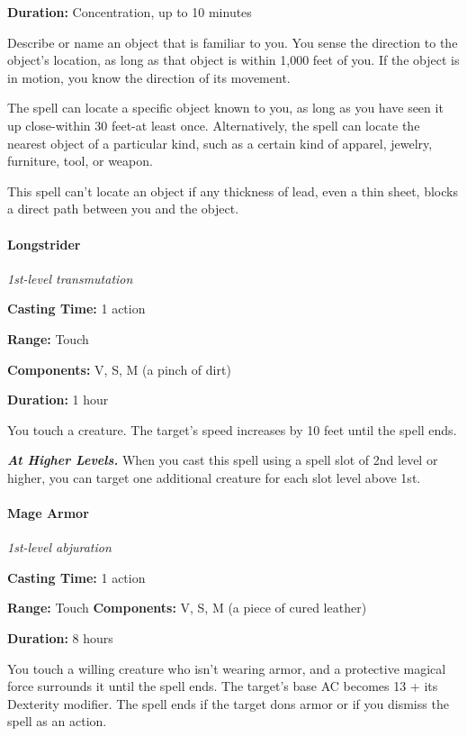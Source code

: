 \documentclass[
]{article}
\begin{document}
\textbf{Duration:} Concentration, up to 10 minutes

Describe or name an object that is familiar to you. You sense the
direction to the object's location, as long as that object is within
1,000 feet of you. If the object is in motion, you know the direction of
its movement.

The spell can locate a specific object known to you, as long as you have
seen it up close-within 30 feet-at least once. Alternatively, the spell
can locate the nearest object of a particular kind, such as a certain
kind of apparel, jewelry, furniture, tool, or weapon.

This spell can't locate an object if any thickness of lead, even a thin
sheet, blocks a direct path between you and the object.

\hypertarget{longstrider}{%
\paragraph{Longstrider}\label{longstrider}}

\emph{1st-level transmutation}

\textbf{Casting Time:} 1 action

\textbf{Range:} Touch

\textbf{Components:} V, S, M (a pinch of dirt)

\textbf{Duration:} 1 hour

You touch a creature. The target's speed increases by 10 feet until the
spell ends.

\emph{\textbf{At Higher Levels.}} When you cast this spell using a spell
slot of 2nd level or higher, you can target one additional creature for
each slot level above 1st.

\hypertarget{mage-armor}{%
\paragraph{Mage Armor}\label{mage-armor}}

\emph{1st-level abjuration}

\textbf{Casting Time:} 1 action

\textbf{Range:} Touch \textbf{Components:} V, S, M (a piece of cured
leather)

\textbf{Duration:} 8 hours

You touch a willing creature who isn't wearing armor, and a protective
magical force surrounds it until the spell ends. The target's base AC
becomes 13 + its Dexterity modifier. The spell ends if the target dons
armor or if you dismiss the spell as an action.
\end{document}
